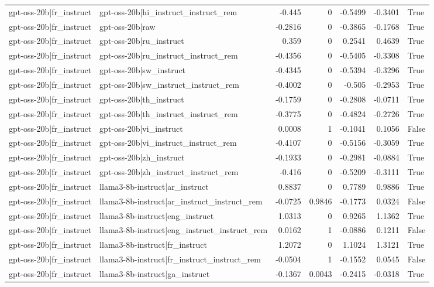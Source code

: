 \begin{table}
\begin{tabular}{l l r r r r l}
gpt-oss-20b|fr_instruct & gpt-oss-20b|hi_instruct_instruct_rem & -0.445 & 0 & -0.5499 & -0.3401 & True \\
gpt-oss-20b|fr_instruct & gpt-oss-20b|raw & -0.2816 & 0 & -0.3865 & -0.1768 & True \\
gpt-oss-20b|fr_instruct & gpt-oss-20b|ru_instruct & 0.359 & 0 & 0.2541 & 0.4639 & True \\
gpt-oss-20b|fr_instruct & gpt-oss-20b|ru_instruct_instruct_rem & -0.4356 & 0 & -0.5405 & -0.3308 & True \\
gpt-oss-20b|fr_instruct & gpt-oss-20b|sw_instruct & -0.4345 & 0 & -0.5394 & -0.3296 & True \\
gpt-oss-20b|fr_instruct & gpt-oss-20b|sw_instruct_instruct_rem & -0.4002 & 0 & -0.505 & -0.2953 & True \\
gpt-oss-20b|fr_instruct & gpt-oss-20b|th_instruct & -0.1759 & 0 & -0.2808 & -0.0711 & True \\
gpt-oss-20b|fr_instruct & gpt-oss-20b|th_instruct_instruct_rem & -0.3775 & 0 & -0.4824 & -0.2726 & True \\
gpt-oss-20b|fr_instruct & gpt-oss-20b|vi_instruct & 0.0008 & 1 & -0.1041 & 0.1056 & False \\
gpt-oss-20b|fr_instruct & gpt-oss-20b|vi_instruct_instruct_rem & -0.4107 & 0 & -0.5156 & -0.3059 & True \\
gpt-oss-20b|fr_instruct & gpt-oss-20b|zh_instruct & -0.1933 & 0 & -0.2981 & -0.0884 & True \\
gpt-oss-20b|fr_instruct & gpt-oss-20b|zh_instruct_instruct_rem & -0.416 & 0 & -0.5209 & -0.3111 & True \\
gpt-oss-20b|fr_instruct & llama3-8b-instruct|ar_instruct & 0.8837 & 0 & 0.7789 & 0.9886 & True \\
gpt-oss-20b|fr_instruct & llama3-8b-instruct|ar_instruct_instruct_rem & -0.0725 & 0.9846 & -0.1773 & 0.0324 & False \\
gpt-oss-20b|fr_instruct & llama3-8b-instruct|eng_instruct & 1.0313 & 0 & 0.9265 & 1.1362 & True \\
gpt-oss-20b|fr_instruct & llama3-8b-instruct|eng_instruct_instruct_rem & 0.0162 & 1 & -0.0886 & 0.1211 & False \\
gpt-oss-20b|fr_instruct & llama3-8b-instruct|fr_instruct & 1.2072 & 0 & 1.1024 & 1.3121 & True \\
gpt-oss-20b|fr_instruct & llama3-8b-instruct|fr_instruct_instruct_rem & -0.0504 & 1 & -0.1552 & 0.0545 & False \\
gpt-oss-20b|fr_instruct & llama3-8b-instruct|ga_instruct & -0.1367 & 0.0043 & -0.2415 & -0.0318 & True \\

\end{tabular}
\end{table}
